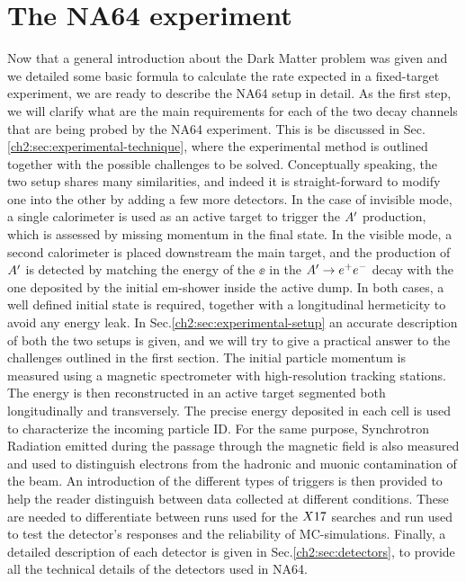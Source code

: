 
\newcommand{\pdirtwo}{chapters/plots/chapter2}

\chapter{The NA64 experiment} %

\label{chapter2} %


Now that a general introduction about the Dark Matter problem was given and we detailed some basic formula to calculate the rate expected in a fixed-target experiment, we are ready to describe the NA64 setup in detail. As the first step, we will clarify what are the main requirements for each of the two decay channels that are being probed by the NA64 experiment. This is be discussed in Sec.\ref{ch2:sec:experimental-technique}, where the experimental method is outlined together with the possible challenges to be solved. Conceptually speaking, the two setup shares many similarities, and indeed it is straight-forward to modify one into the other by adding a few more detectors. In the case of invisible mode, a single calorimeter is used as an active target to trigger the $A'$ production, which is assessed by missing momentum in the final state. In the visible mode, a second calorimeter is placed downstream the main target, and the production of $A'$ is detected by matching the energy of the $\ee$ in the $A' \to e^+e^-$ decay with the one deposited by the initial em-shower inside the active dump. In both cases, a well defined initial state is required, together with a longitudinal hermeticity to avoid any energy leak. In Sec.\ref{ch2:sec:experimental-setup} an accurate description of both the two setups is given, and we will try to give a practical answer to the challenges outlined in the first section. The initial particle momentum is measured using a magnetic spectrometer with high-resolution tracking stations. The energy is then reconstructed in an active target segmented both longitudinally and transversely. The precise energy deposited in each cell is used to characterize the incoming particle ID. For the same purpose, Synchrotron Radiation emitted during the passage through the magnetic field is also measured and used to distinguish electrons from the hadronic and muonic contamination of the beam. An introduction of the different types of triggers is then provided to help the reader distinguish between data collected at different conditions. These are needed to differentiate between runs used for the $X17$ searches and run used to test the detector's responses and the reliability of MC-simulations.
Finally, a detailed description of each detector is given in Sec.\ref{ch2:sec:detectors}, to provide all the technical details of the detectors used in NA64. 

